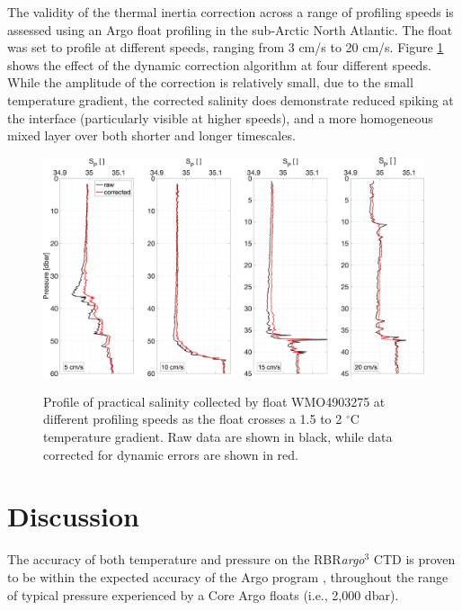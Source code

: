 \documentclass{ametsocV6.1}
\begin{document}
The validity of the thermal inertia correction across a range of profiling speeds is assessed using an Argo float profiling in the sub-Arctic North Atlantic. The float was set to profile at different speeds, ranging from 3 cm/s to 20 cm/s. Figure \ref{fig: argo_examples} shows the effect of the dynamic correction algorithm at four different speeds.  While the amplitude of the correction is relatively small, due to the small temperature gradient, the corrected salinity does demonstrate reduced spiking at the interface (particularly visible at higher speeds), and a more homogeneous mixed layer over both shorter and longer timescales.

\begin{figure}[t]
	\centering
	\includegraphics[width=.95\linewidth]{Fig13_Arcticfloat}\\

	\caption{Profile of practical salinity collected by float WMO4903275 at different profiling speeds as the float crosses a 1.5 to 2 $^\circ$C temperature gradient.  Raw data are shown in black, while data corrected for dynamic errors are shown in red. }
	\label{fig: argo_examples}
\end{figure}

\section{Discussion}
\label{sec: discussion}

The accuracy of both temperature and pressure on the RBR\textit{argo}$^3$ CTD is proven to be within the expected accuracy of the Argo program \citep[$\pm$0.002 $^\circ$C and $\pm$2.4 dbar, respectively;][]{Wong_2020}, throughout the range of typical pressure experienced by a Core Argo floats (i.e.,  2,000 dbar). 
\end{document}
